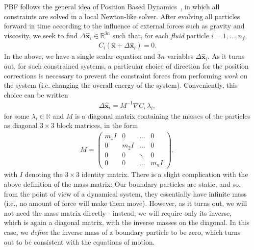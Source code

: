 \documentclass[11pt,a4paper,onesided]{vci_anim_exercise}
\renewcommand{\vec}[1]{\boldsymbol{\mathbf{#1}}}
\begin{document}
PBF follows the general idea of Position Based Dynamics~\cite{mhhr07}, in which all constraints are solved in a local Newton-like solver. After evolving all particles forward in time according to the influence of external forces such as gravity and viscosity, we seek to find $\Delta \hat{\vec x}_i \in \mathbb{R}^{3n}$ such that, for each \emph{fluid} particle $i = 1, \dots, n_f$,
\begin{align}
C_i (\hat{\vec x} + \Delta \hat{\vec x}_i) = 0.
\end{align}
In the above, we have a single scalar equation and $3n$ variables $\Delta \hat{\vec x}_i$. As it turns out, for such constrained systems, a particular choice of direction for the position corrections is necessary to prevent the constraint forces from performing \emph{work} on the system (i.e. changing the overall energy of the system). Conveniently, this choice can be written
\begin{align}
\Delta \hat{\vec x}_i = M^{-1} \nabla C_i \, \lambda_i,
\label{eq:pbf_position_update}
\end{align}
for some $\lambda_i \in \mathbb{R}$ and $M$ is a diagonal matrix containing the masses of the particles as diagonal $3 \times 3$ block matrices, in the form
\begin{align*}
M = \begin{pmatrix}
m_1 I & 0     & \dots  & 0\\
0     & m_2 I & \dots  & 0 \\
0     & 0     & \ddots & 0 \\
0     & 0     & \dots  & m_n I
\end{pmatrix},
\end{align*}
with $I$ denoting the $3 \times 3$ identity matrix. There is a slight complication with the above definition of the mass matrix: Our boundary particles are static, and so, from the point of view of a dynamical system, they essentially have infinite mass (i.e., no amount of force will make them move). However, as it turns out, we will not need the mass matrix directly - instead, we will require only its inverse, which is again a diagonal matrix, with the inverse masses on the diagonal. In this case, we \emph{define} the inverse mass of a boundary particle to be zero, which turns out to be consistent with the equations of motion.
\end{document}
